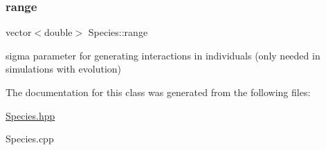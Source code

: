 \subsubsection{\texorpdfstring{range}{range}}
{\footnotesize\ttfamily vector$<$double$>$ Species\+::range\hspace{0.3cm}{\ttfamily [protected]}}

sigma parameter for generating interactions in individuals (only needed in simulations with evolution) 

The documentation for this class was generated from the following files\+:\begin{DoxyCompactItemize}
\item 
\hyperlink{Species_8hpp}{Species.\+hpp}\item 
Species.\+cpp\end{DoxyCompactItemize}
